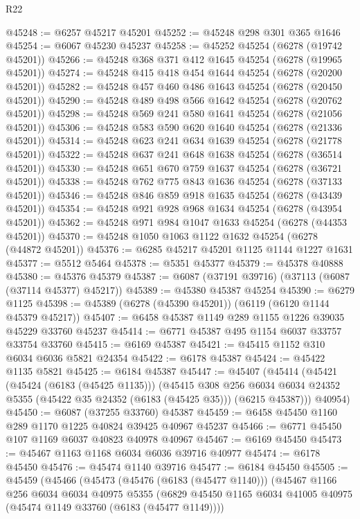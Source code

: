 \begin{lexlean}{R22}
\begin{coremodule}
@45248 := @6257 @45217 @45201
@45252 := @45248 @298 @301 @365 @1646
@45254 := @6067 @45230 @45237
@45258 := @45252 @45254 (@6278 (@19742 @45201))
@45266 := @45248 @368 @371 @412 @1645 @45254 (@6278 (@19965 @45201))
@45274 := @45248 @415 @418 @454 @1644 @45254 (@6278 (@20200 @45201))
@45282 := @45248 @457 @460 @486 @1643 @45254 (@6278 (@20450 @45201))
@45290 := @45248 @489 @498 @566 @1642 @45254 (@6278 (@20762 @45201))
@45298 := @45248 @569 @241 @580 @1641 @45254 (@6278 (@21056 @45201))
@45306 := @45248 @583 @590 @620 @1640 @45254 (@6278 (@21336 @45201))
@45314 := @45248 @623 @241 @634 @1639 @45254 (@6278 (@21778 @45201))
@45322 := @45248 @637 @241 @648 @1638 @45254 (@6278 (@36514 @45201))
@45330 := @45248 @651 @670 @759 @1637 @45254 (@6278 (@36721 @45201))
@45338 := @45248 @762 @775 @843 @1636 @45254 (@6278 (@37133 @45201))
@45346 := @45248 @846 @859 @918 @1635 @45254 (@6278 (@43439 @45201))
@45354 := @45248 @921 @928 @968 @1634 @45254 (@6278 (@43954 @45201))
@45362 := @45248 @971 @984 @1047 @1633 @45254 (@6278 (@44353 @45201))
@45370 := @45248 @1050 @1063 @1122 @1632 @45254 (@6278 (@44872 @45201))
@45376 := @6285 @45217 @45201 @1125 @1144 @1227 @1631
@45377 := @5512 @5464
@45378 := @5351 @45377
@45379 := @45378 @40888
@45380 := @45376 @45379
@45387 := @6087 (@37191 @39716) (@37113 (@6087 (@37114 @45377) @45217))
@45389 := @45380 @45387 @45254
@45390 := @6279 @1125
@45398 := @45389 (@6278 (@45390 @45201)) (@6119 (@6120 @1144 @45379 @45217))
@45407 := @6458 @45387 @1149 @289 @1155 @1226 @39035 @45229 @33760 @45237
@45414 := @6771 @45387 @495 @1154 @6037 @33757 @33754 @33760
@45415 := @6169 @45387
@45421 := @45415 @1152 @310 @6034 @6036 @5821 @24354
@45422 := @6178 @45387
@45424 := @45422 @1135 @5821
@45425 := @6184 @45387
@45447 := @45407
    (@45414
      (@45421
        (@45424 (@6183 (@45425 @1135)))
        (@45415
          @308
          @256
          @6034
          @6034
          @24352
          @5355
          (@45422 @35 @24352 (@6183 (@45425 @35)))
          (@6215 @45387)))
      @40954)
@45450 := @6087 (@37255 @33760) @45387
@45459 := @6458 @45450 @1160 @289 @1170 @1225 @40824 @39425 @40967 @45237
@45466 := @6771 @45450 @107 @1169 @6037 @40823 @40978 @40967
@45467 := @6169 @45450
@45473 := @45467 @1163 @1168 @6034 @6036 @39716 @40977
@45474 := @6178 @45450
@45476 := @45474 @1140 @39716
@45477 := @6184 @45450
@45505 := @45459
    (@45466
      (@45473
        (@45476 (@6183 (@45477 @1140)))
        (@45467
          @1166
          @256
          @6034
          @6034
          @40975
          @5355
          (@6829 @45450 @1165 @6034 @41005 @40975 (@45474 @1149 @33760 (@6183 (@45477 @1149))))

\end{coremodule}
\end{lexlean}
